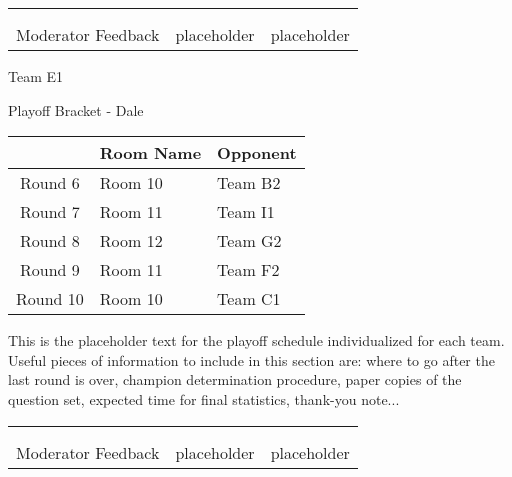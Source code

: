 \documentclass{article}%
\begin{document}
\newline%
%
\begin{tabularx}{\textwidth}{YYY}%
  &  &  \\%
\\%
Moderator Feedback&placeholder&placeholder\\%
\end{tabularx}%
\newpage%
\begin{center}%
\begin{Huge}%
Team E1%
\end{Huge}%
\vspace*{12pt}%
\linebreak%
\begin{Large}%
Playoff Bracket {-} Dale%
\end{Large}%
\end{center}%
\vspace*{4pt}%
%
\begin{tabularx}{\textwidth}{|c|Y|Y|}%
\hline%
&Room Name&Opponent\\%
\hline%
Round 6&Room 10&Team B2\\%
Round 7&Room 11&Team I1\\%
Round 8&Room 12&Team G2\\%
Round 9&Room 11&Team F2\\%
Round 10&Room 10&Team C1\\%
\hline%
\end{tabularx}%
\vspace*{30pt}%
\linebreak%
This is the placeholder text for the playoff schedule individualized for each team. Useful pieces of information to include in this section are: where to go after the last round is over, champion determination procedure, paper copies of the question set, expected time for final statistics, thank{-}you note...%
\vspace*{30pt}%
\newline%
%
\begin{tabularx}{\textwidth}{YYY}%
  &  &  \\%
\\%
Moderator Feedback&placeholder&placeholder\\%
\end{tabularx}%
\end{document}
